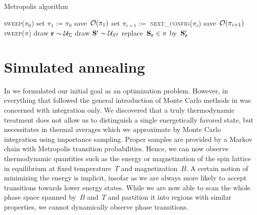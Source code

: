 \begin{algorithm}
  \caption{Metropolis algorithm}\label{alg:metropolis}
  \begin{algorithmic}[1]
    \Statex
     
       
        \State \textsc{sweep}($\pi_0$)
      \EndFor
      \State set $\pi_1 := \pi_0$
      \State save~$\mathcal{O}(\pi_1)$
        \State set $\pi_{i+1} :=$ \textsc{next\_config}($\pi_i$)
        \State save~$\mathcal{O}(\pi_{i+1})$
      \EndFor
    \EndProcedure
    \Statex
        \State \textsc{sweep}($\pi$)
      \EndFor
      \State \Return{$\pi$}
    \EndFunction
    \Statex
     
        \State draw $\mathbf{r} \sim \mathcal{U}_{\Sigma}$
        \State draw $\mathbf{S}' \sim \mathcal{U}_{S^2}$
            \State replace~$\mathbf{S}_{\mathbf{r}} \in \pi$ by~$\mathbf{S}'_{\mathbf{r}}$
        \EndIf
      \EndFor
    \EndProcedure
  \end{algorithmic}
\end{algorithm}

%
\section{Simulated annealing}\label{sec:siman}
%
In  we formulated our initial goal as an optimization problem.
However, in everything that followed the general introduction of Monte Carlo
methods in  was concerned with integration only. We discovered
that a truly thermodynamic treatment does not allow us to distinguish a single
energetically favored state, but necessitates in thermal averages which we
approximate by Monte Carlo integration using importance sampling. Proper
samples are provided by a Markov chain with Metropolis transition probabilities.
Hence, we can now observe thermodynamic quantities such as the energy or
magnetization of the spin lattice in equilibrium at fixed temperature~$T$ and
magnetization~$B$. A certain notion of minimizing the energy is implicit,
insofar as we are always more likely to accept transitions towards lower energy
states. While we are now able to scan the whole phase space spanned by~$B$
and~$T$ and partition it into regions with similar properties, we cannot
dynamically observe phase transitions.

